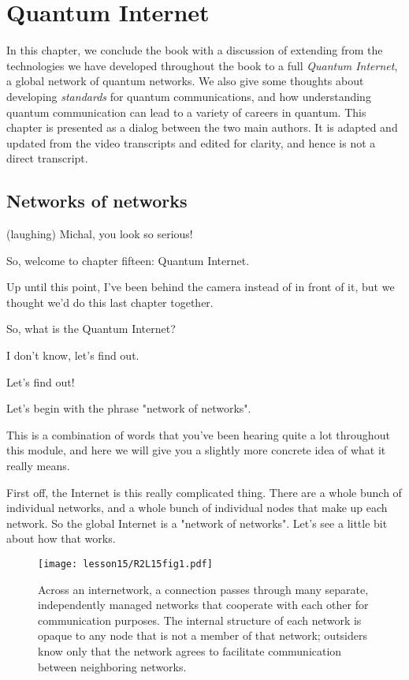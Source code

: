 \chapter{Quantum Internet}

In this chapter, we conclude the book with a discussion of extending from the technologies we have developed throughout the book to a full \emph{Quantum Internet}, a global network of quantum networks. We also give some thoughts about developing \emph{standards} for quantum communications, and how understanding quantum communication can lead to a variety of careers in quantum. This chapter is presented as a dialog between the two main authors. It is adapted and updated from the video transcripts and edited for clarity, and hence is not a direct transcript.

\section{Networks of networks}

\rrr (laughing) Michal, you look so serious!

So, welcome to chapter fifteen: Quantum Internet.

Up until this point, I've been behind the camera instead of in front of it, but we thought we'd do this last chapter together.

\mmm So, what is the Quantum Internet?

\rrr I don't know, let's find out. 

\mmm Let's find out!

Let's begin with the phrase "network of networks".

This is a combination of words that you've been hearing quite a lot throughout this module, and here we will give you a slightly more concrete idea of what it really means.

\rrr First off, the Internet is this really complicated thing. There are a whole bunch of individual networks, and a whole bunch of individual nodes that make up each network. So the global Internet is a "network of networks". Let's see a little bit about how that works.

\begin{figure}[t]
    \centering
    \texttt{[image: lesson15/R2L15fig1.pdf]}
    \caption[Network of Networks]{Across an internetwork, a connection passes through many separate, independently managed networks that cooperate with each other for communication purposes.  The internal structure of each network is opaque to any node that is not a member of that network; outsiders know only that the network agrees to facilitate communication between neighboring networks.}
    \label{fig:15-1-NofN}
\end{figure}


